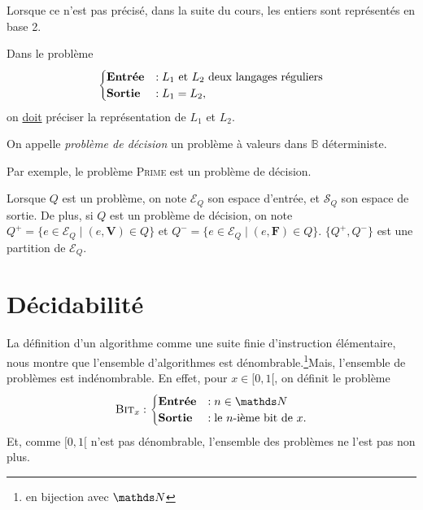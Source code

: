 \begin{rmk}
	Lorsque ce n'est pas précisé, dans la suite du cours, les entiers sont représentés en base 2.
\end{rmk}

\begin{exm}
	Dans le problème \[
		\begin{cases}
			\text{\textbf{Entrée}} &: L_1 \text{ et } L_2 \text{ deux langages réguliers}\\
			\text{\textbf{Sortie}} &: L_1 = L_2,
		\end{cases}
	\] on \ul{doit} préciser la représentation de $L_1$\/ et $L_2$.
\end{exm}

\begin{defn}
	On appelle \textit{problème de décision} un problème à valeurs dans $\mathds{B}$\/ déterministe.
\end{defn}

\begin{exm}
	Par exemple, le problème \textsc{Prime} est un problème de décision.
\end{exm}

\begin{rmk}[Notation]
	Lorsque $Q$\/ est un problème, on note $\mathcal{E}_Q$\/ son espace d'entrée, et $\mathcal{S}_Q$\/ son espace de sortie.
	De plus, si $Q$\/ est un problème de décision, on note $Q^+ = \{e \in \mathcal{E}_Q  \mid (e, \mathbf{V}) \in Q\}$\/ et $Q^- = \{e \in \mathcal{E}_Q  \mid (e, \mathbf{F}) \in Q\}$. $\{Q^+,Q^-\}$\/ est une partition de $\mathcal{E}_Q$.
\end{rmk}

\section{Décidabilité}

La définition d'un algorithme comme une suite finie d'instruction élémentaire, nous montre que l'ensemble d'algorithmes est dénombrable.\footnote{en bijection avec $\N$}\@ Mais, l'ensemble de problèmes est indénombrable. En effet, pour $x \in [0,1[$, on définit le problème \[
	\text{\textsc{Bit}}_x : \begin{cases}
		\text{\textbf{Entrée}} &: n \in \N\\
		\text{\textbf{Sortie}} &: \text{le $n$-ième bit de } x.
	\end{cases}
\]
Et, comme $[0,1[$\/ n'est pas dénombrable, l'ensemble des problèmes ne l'est pas non plus.

